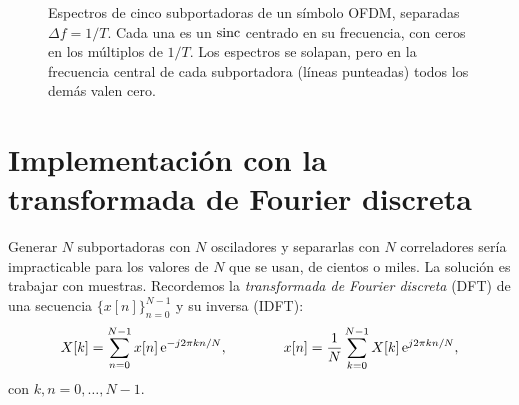 \begin{figure}
    \begin{center}
    \end{center}
    \caption{Espectros de cinco subportadoras de un símbolo OFDM, separadas $\Delta f=1/T$. Cada una es un $\operatorname{sinc}$ centrado en su frecuencia, con ceros en los múltiplos de $1/T$. Los espectros se solapan, pero en la frecuencia central de cada subportadora (líneas punteadas) todos los demás valen cero.}\label{fig:espectro ofdm}
\end{figure}

\section{Implementación con la transformada de Fourier discreta}\label{sec:ofdm dft}

Generar $N$ subportadoras con $N$ osciladores y separarlas con $N$ correladores sería impracticable para los valores de $N$ que se usan, de cientos o miles. La solución es trabajar con muestras. Recordemos la \emph{transformada de Fourier discreta} (DFT) de una secuencia $\{x[n]\}_{n=0}^{N-1}$ y su inversa (IDFT):
\begin{equation}\label{eq:dft}
    X[k] = \sum_{n=0}^{N-1} x[n]\,\mathrm{e}^{-j2\pi kn/N}, \qquad\qquad x[n] = \frac{1}{N}\sum_{k=0}^{N-1} X[k]\,\mathrm{e}^{j2\pi kn/N},
\end{equation}
con $k,n=0,\ldots,N-1$.

